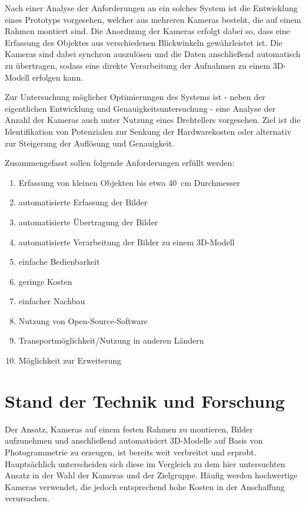 \documentclass[./00PhotoBox]{subfiles}
\begin{document}
Nach einer Analyse der Anforderungen an ein solches System ist die Entwicklung eines Prototyps vorgesehen, welcher aus mehreren Kameras besteht, die auf einem Rahmen montiert sind. Die Anordnung der Kameras erfolgt dabei so, dass eine Erfassung des Objektes aus verschiedenen Blickwinkeln gewährleistet ist. Die Kameras sind dabei synchron auszulösen und die Daten anschließend au\-to\-ma\-tisch zu übertragen, sodass eine direkte Verarbeitung der Aufnahmen zu einem 3D-Modell erfolgen kann.

Zur Untersuchung möglicher Optimierungen des Systems ist - neben der eigentlichen Entwicklung und Genauigkeitsuntersuchung - eine Analyse der Anzahl der Kameras auch unter Nutzung eines Drehtellers vorgesehen. Ziel ist die Identifikation von Potenzialen zur Senkung der Hardwarekosten oder alternativ zur Steigerung der Auflösung und Genauigkeit.

Zusammengefasst sollen folgende Anforderungen erfüllt werden:

\begin{enumerate}
    \item Erfassung von kleinen Objekten bis etwa \SI{40}{\centi\metre} Durchmesser
    \item automatisierte Erfassung der Bilder
    \item automatisierte Übertragung der Bilder
    \item automatisierte Verarbeitung der Bilder zu einem 3D-Modell
    \item einfache Bedienbarkeit
    \item geringe Kosten
    \item einfacher Nachbau
    \item Nutzung von Open-Source-Software
    \item Transportmöglichkeit/Nutzung in anderen Ländern
    \item Möglichkeit zur Erweiterung
\end{enumerate}

\section{Stand der Technik und Forschung}
Der Ansatz, Kameras auf einem festen Rahmen zu montieren, Bilder aufzunehmen und anschließend automatisiert 3D-Modelle auf Basis von Photogrammetrie zu erzeugen, ist bereits weit verbreitet und erprobt. Hauptsächlich unterscheiden sich diese im Vergleich zu dem hier untersuchten Ansatz in der Wahl der Kameras und der Zielgruppe. Häufig werden hochwertige Kameras verwendet, die jedoch entsprechend hohe Kosten in der Anschaffung verursachen.
\end{document}
